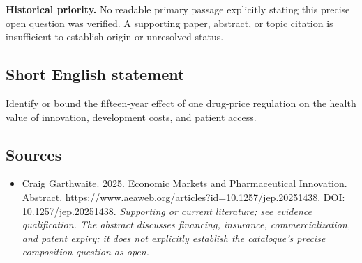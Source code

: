 \documentclass[11pt]{article}
\begin{document}
\par\textbf{Historical priority.} No readable primary passage explicitly stating this precise open question was verified. A supporting paper, abstract, or topic citation is insufficient to establish origin or unresolved status.

\subsection{Short English statement}
Identify or bound the fifteen-year effect of one drug-price regulation on the health value of innovation, development costs, and patient access.

\subsection{Sources}
\begin{itemize}\raggedright
\item[\textnormal{[S1]}]\hypertarget{source:30007727:1}{} Craig Garthwaite. 2025. Economic Markets and Pharmaceutical Innovation. Abstract.
\url{https://www.aeaweb.org/articles?id=10.1257/jep.20251438}.
DOI: 10.1257/jep.20251438.
{\small\textit{Supporting or current literature; see evidence qualification. The abstract discusses financing, insurance, commercialization, and patent expiry; it does not explicitly establish the catalogue’s precise composition question as open.}}
\end{itemize}
\end{document}
